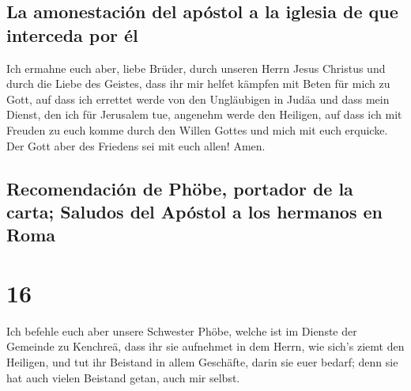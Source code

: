 \hypertarget{la-amonestaciuxf3n-del-apuxf3stol-a-la-iglesia-de-que-interceda-por-uxe9l}{%
\subsection{La amonestación del apóstol a la iglesia de que interceda
por
él}\label{la-amonestaciuxf3n-del-apuxf3stol-a-la-iglesia-de-que-interceda-por-uxe9l}}

 Ich ermahne euch aber, liebe Brüder, durch unseren Herrn
Jesus Christus und durch die Liebe des Geistes, dass ihr mir helfet
kämpfen mit Beten für mich zu Gott,  auf dass ich
errettet werde von den Ungläubigen in Judäa und dass mein Dienst, den
ich für Jerusalem tue, angenehm werde den Heiligen,  auf
dass ich mit Freuden zu euch komme durch den Willen Gottes und mich mit
euch erquicke.  Der Gott aber des Friedens sei mit euch
allen! Amen.

\hypertarget{recomendaciuxf3n-de-phuxf6be-portador-de-la-carta-saludos-del-apuxf3stol-a-los-hermanos-en-roma}{%
\subsection{Recomendación de Phöbe, portador de la carta; Saludos del
Apóstol a los hermanos en
Roma}\label{recomendaciuxf3n-de-phuxf6be-portador-de-la-carta-saludos-del-apuxf3stol-a-los-hermanos-en-roma}}

\hypertarget{section-15}{%
\section{16}\label{section-15}}

 Ich befehle euch aber unsere Schwester Phöbe, welche ist
im Dienste der Gemeinde zu Kenchreä,  dass ihr sie
aufnehmet in dem Herrn, wie sich's ziemt den Heiligen, und tut ihr
Beistand in allem Geschäfte, darin sie euer bedarf; denn sie hat auch
vielen Beistand getan, auch mir selbst.

